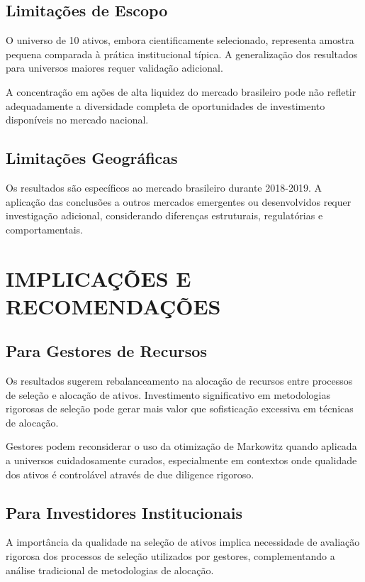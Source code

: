 \subsection{Limitações de Escopo}

O universo de 10 ativos, embora cientificamente selecionado, representa amostra pequena comparada à prática institucional típica. A generalização dos resultados para universos maiores requer validação adicional.

A concentração em ações de alta liquidez do mercado brasileiro pode não refletir adequadamente a diversidade completa de oportunidades de investimento disponíveis no mercado nacional.

\subsection{Limitações Geográficas}

Os resultados são específicos ao mercado brasileiro durante 2018-2019. A aplicação das conclusões a outros mercados emergentes ou desenvolvidos requer investigação adicional, considerando diferenças estruturais, regulatórias e comportamentais.

\section{IMPLICAÇÕES E RECOMENDAÇÕES}

\subsection{Para Gestores de Recursos}

Os resultados sugerem rebalanceamento na alocação de recursos entre processos de seleção e alocação de ativos. Investimento significativo em metodologias rigorosas de seleção pode gerar mais valor que sofisticação excessiva em técnicas de alocação.

Gestores podem reconsiderar o uso da otimização de Markowitz quando aplicada a universos cuidadosamente curados, especialmente em contextos onde qualidade dos ativos é controlável através de due diligence rigoroso.

\subsection{Para Investidores Institucionais}

A importância da qualidade na seleção de ativos implica necessidade de avaliação rigorosa dos processos de seleção utilizados por gestores, complementando a análise tradicional de metodologias de alocação.

